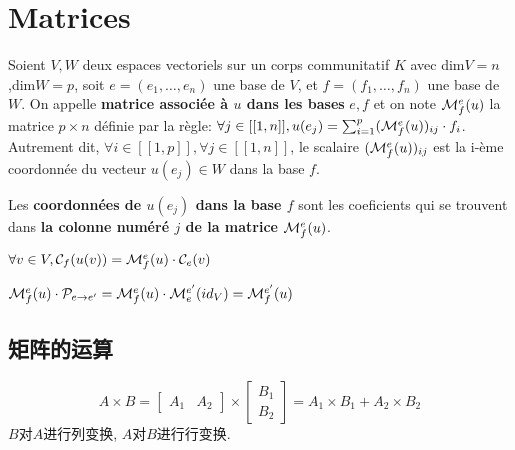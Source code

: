 \documentclass{book}
\begin{document}
\chapter{Matrices}
\begin{definition}
  Soient $V,W$ deux espaces vectoriels sur un corps communitatif $K$ avec dim$V=n$,dim$W=p$,\newline
  soit $e=(e_1,\ldots,e_n)$ une base de $V$, et $f=(f_1,\ldots,f_n)$ une base de $W$. \newline
  On appelle {\bf matrice associ\'ee \`a $u$ dans les bases} $e,f$ et on note ${\cal M}_f^e(u)$ la matrice $p \times n$ d\'efinie par la r\`egle:
  $\forall j \in [[1,n]], u(e_j)= \sum_{i=1}^p ({\cal M}_f^e(u))_{ij} \cdot f_i $. Autrement dit,
  $\forall i \in [[1,p]],\forall j \in [[1,n]]$, le scalaire $({\cal M}_f^e(u))_{ij}$ est la i-\`eme coordonn\'ee du vecteur $u(e_j) \in W $ dans la base $f$.
\end{definition}
\begin{note}
  Les {\bf coordonn\'ees de $u(e_j)$ dans la base $f$} sont les coeficients qui se trouvent dans {\bf la colonne num\'er\'e $j$ de la matrice}
  ${\cal M}_f^e(u)$.
\end{note}

\begin{theorem}
  $ \forall v \in V, {\cal C}_f(u(v))= {\cal M}_f^e(u)\cdot {\cal C}_e(v) $
\end{theorem}

\begin{note}
 $ {\cal M}_f^e(u)\cdot {\cal P}_{e\rightarrow e'}= {\cal M}_f^e(u)\cdot {\cal M}_e^{e'}(id_V)={\cal M}_f^{e'}(u)$
\end{note}

\section{矩阵的运算}
$$
A \times B = 
\begin{bmatrix}
	A_1 & A_2
\end{bmatrix}
\times
\begin{bmatrix}
	B_1 \\
	B_2
\end{bmatrix}
=
A_1 \times B_1 + A_2 \times B_2
$$
$B$对$A$进行列变换, $A$对$B$进行行变换.
\end{document}
